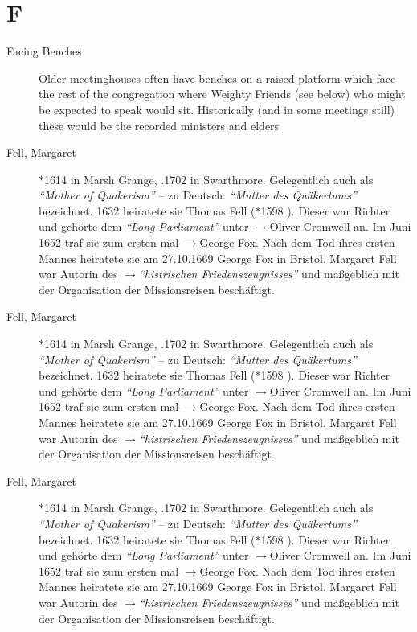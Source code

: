 \section*{F}

\articlesize

\begin{description}

\item[Facing Benches]
    Older meetinghouses often have benches on a raised platform which face the rest of the congregation where Weighty Friends (see below) who might be expected to speak would sit. Historically (and in some meetings still) these would be the recorded ministers and elders
    
 \item[Fell, Margaret] $\ast$1614 in Marsh Grange, .1702 in Swarthmore. Gelegentlich auch als \textit{"`Mother of Quakerism"'} -- zu Deutsch: \textit{"`Mutter des Quäkertums"'} bezeichnet. 1632 heiratete sie Thomas Fell ($\ast$1598 ). Dieser war Richter und gehörte dem \textit{"`Long Parliament"'} unter $\to$Oliver Cromwell an. Im Juni 1652 traf sie zum ersten mal $\to$George Fox. Nach dem Tod ihres ersten Mannes heiratete sie am 27.10.1669 George Fox in Bristol. Margaret Fell war Autorin des $\to$\textit{"`histrischen Friedenszeugnisses"'} und maßgeblich mit der Organisation der Missionsreisen beschäftigt.


 \item[Fell, Margaret] $\ast$1614 in Marsh Grange, .1702 in Swarthmore. Gelegentlich auch als \textit{"`Mother of Quakerism"'} -- zu Deutsch: \textit{"`Mutter des Quäkertums"'} bezeichnet. 1632 heiratete sie Thomas Fell ($\ast$1598 ). Dieser war Richter und gehörte dem \textit{"`Long Parliament"'} unter $\to$Oliver Cromwell an. Im Juni 1652 traf sie zum ersten mal $\to$George Fox. Nach dem Tod ihres ersten Mannes heiratete sie am 27.10.1669 George Fox in Bristol. Margaret Fell war Autorin des $\to$\textit{"`histrischen Friedenszeugnisses"'} und maßgeblich mit der Organisation der Missionsreisen beschäftigt.


 \item[Fell, Margaret] $\ast$1614 in Marsh Grange, .1702 in Swarthmore. Gelegentlich auch als \textit{"`Mother of Quakerism"'} -- zu Deutsch: \textit{"`Mutter des Quäkertums"'} bezeichnet. 1632 heiratete sie Thomas Fell ($\ast$1598 ). Dieser war Richter und gehörte dem \textit{"`Long Parliament"'} unter $\to$Oliver Cromwell an. Im Juni 1652 traf sie zum ersten mal $\to$George Fox. Nach dem Tod ihres ersten Mannes heiratete sie am 27.10.1669 George Fox in Bristol. Margaret Fell war Autorin des $\to$\textit{"`histrischen Friedenszeugnisses"'} und maßgeblich mit der Organisation der Missionsreisen beschäftigt.


\end{description}
